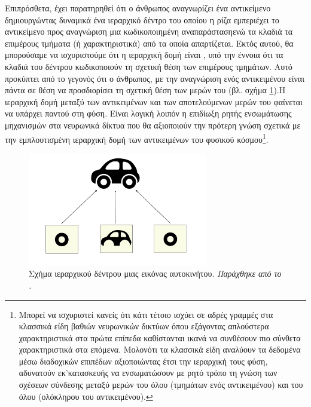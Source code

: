 Επιπρόσθετα, έχει παρατηρηθεί ότι ο άνθρωπος αναγνωρίζει ένα αντικείμενο δημιουργώντας δυναμικά ένα ιεραρχικό δέντρο του οποίου η ρίζα εμπεριέχει το αντικείμενο προς αναγνώριση  μια κωδικοποιημένη αναπαράσταση\textemdash ενώ τα κλαδιά τα επιμέρους τμήματα (ή χαρακτηριστικά) από τα οποία απαρτίζεται. Εκτός αυτού, θα μπορούσαμε να ισχυριστούμε ότι η ιεραρχική δομή είναι , υπό την έννοια ότι τα κλαδιά του δέντρου κωδικοποιούν τη σχετική θέση των επιμέρους τμημάτων\cite{hinton2021represent}. Αυτό προκύπτει από το γεγονός ότι ο άνθρωπος, με την αναγνώριση ενός αντικειμένου είναι πάντα σε θέση να προσδιορίσει τη σχετική θέση των μερών του (βλ. σχήμα \ref{fig:car}).Η ιεραρχική δομή μεταξύ των αντικειμένων και των αποτελούμενων μερών του φαίνεται να υπάρχει παντού στη φύση. Είναι λογική λοιπόν η επιδίωξη ρητής ενσωμάτωσης μηχανισμών στα νευρωνικά δίκτυα που θα αξιοποιούν την πρότερη γνώση σχετικά με την εμπλουτισμένη ιεραρχική δομή των αντικειμένων του φυσικού κόσμου\footnote{Μπορεί να ισχυριστεί κανείς ότι κάτι τέτοιο ισχύει σε αδρές γραμμές στα κλασσικά είδη βαθιών νευρωνικών δικτύων όπου εξάγοντας απλούστερα χαρακτηριστικά στα πρώτα επίπεδα καθίστανται ικανά να συνθέσουν πιο σύνθετα χαρακτηριστικά στα επόμενα. Μολονότι τα κλασσικά είδη αναλύουν τα δεδομένα μέσω διαδοχικών επιπέδων αξιοποιώντας έτσι την ιεραρχική τους φύση, αδυνατούν εκ'κατασκευής να ενσωματώσουν με ρητό τρόπο τη γνώση των σχέσεων σύνδεσης μεταξύ μερών του όλου (τμημάτων ενός αντικειμένου) και του όλου (ολόκληρου του αντικειμένου).}.\par
\begin{figure}[h]
  \centering
  \includegraphics[width=0.7\textwidth]{images/chapter theoritical background/car_tree.pdf}
  \caption{Σχήμα ιεραρχικού δέντρου μιας εικόνας αυτοκινήτου. \textit{Παράχθηκε από το \href{https://inkscape.org/}{}.}} 
  \label{fig:car}
\end{figure} 
